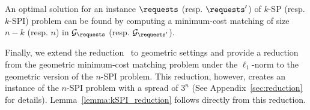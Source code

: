 
\begin{lemma}\label{lemma:matching-reduction} 
An optimal solution for an instance $\requests$ (resp. $\requests'$) of $k$-SP (resp. $k$-SPI)  problem can be found by computing a minimum-cost matching of size $n-k$ (resp. $n$) in $\mathcal{G}_{\requests}$ (resp. $\mathcal{G}_{\requests'}$).
\end{lemma}



Finally, we extend the reduction~\citet{chrobak1991new} to geometric settings and provide a reduction from the geometric minimum-cost matching problem under the $\ell_1$-norm to the geometric version of the $n$-SPI problem. 
This reduction, however, creates an instance of the $n$-SPI problem with a spread of $3^n$ (See Appendix~\ref{sec:reduction} for details). Lemma~\ref{lemma:kSPI_reduction} follows directly from this reduction.  %

